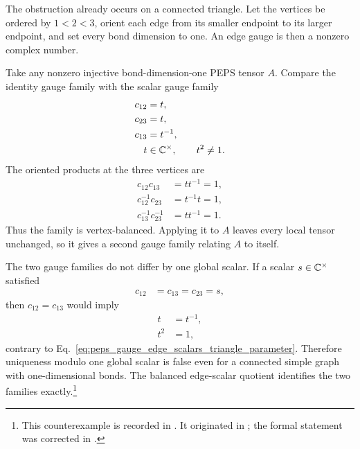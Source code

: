 \documentclass{article}
\begin{document}
The obstruction already occurs on a connected triangle. Let the vertices be
ordered by $1<2<3$, orient each edge from its smaller endpoint to its larger
endpoint, and set every bond dimension to one. An edge gauge is then a nonzero
complex number.

Take any nonzero injective bond-dimension-one PEPS tensor $A$. Compare the
identity gauge family with the scalar gauge family
\begin{align}
    c_{12}
        &= t,
    \label{eq:peps_gauge_edge_scalars_triangle_edge_twelve}\\
    c_{23}
        &= t,
    \label{eq:peps_gauge_edge_scalars_triangle_edge_twentythree}\\
    c_{13}
        &= t^{-1},
    \label{eq:peps_gauge_edge_scalars_triangle_edge_thirteen}\\
    t
        &\in \mathbb{C}^\times,
        \qquad t^2\neq 1.
    \label{eq:peps_gauge_edge_scalars_triangle_parameter}
\end{align}
The oriented products at the three vertices are
\begin{align}
    c_{12}c_{13}
        &= tt^{-1}
         = 1,
    \label{eq:peps_gauge_edge_scalars_triangle_balance_vertex_one}\\
    c_{12}^{-1}c_{23}
        &= t^{-1}t
         = 1,
    \label{eq:peps_gauge_edge_scalars_triangle_balance_vertex_two}\\
    c_{13}^{-1}c_{23}^{-1}
        &= tt^{-1}
         = 1.
    \label{eq:peps_gauge_edge_scalars_triangle_balance_vertex_three}
\end{align}
Thus the family is vertex-balanced. Applying it to $A$ leaves every local
tensor unchanged, so it gives a second gauge family relating $A$ to itself.

The two gauge families do not differ by one global scalar. If a scalar
$s\in\mathbb{C}^\times$ satisfied
\begin{align}
    c_{12}
        &= c_{13}
         = c_{23}
         = s,
    \label{eq:peps_gauge_edge_scalars_hypothetical_global_scalar}
\end{align}
then $c_{12}=c_{13}$ would imply
\begin{align}
    t
        &= t^{-1},
    \label{eq:peps_gauge_edge_scalars_triangle_inverse_equality}\\
    t^2
        &= 1,
    \label{eq:peps_gauge_edge_scalars_triangle_parameter_contradiction}
\end{align}
contrary to Eq.~\ref{eq:peps_gauge_edge_scalars_triangle_parameter}. Therefore
uniqueness modulo one global scalar is false even for a connected simple graph
with one-dimensional bonds. The balanced edge-scalar quotient identifies the
two families exactly.\footnote{This counterexample is recorded in
. It originated in ; the
formal statement was corrected in .}
\end{document}

